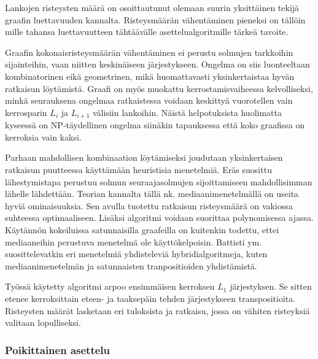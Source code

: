 \documentclass[finnish,12pt]{article}
\begin{document}

Lankojen risteysten määrä on osoittautunut olemaan suurin yksittäinen tekijä graafin luettavuuden kannalta. \cite{RefWorks:47}
Risteysmäärän vähentäminen pieneksi on tällöin mille tahansa luettavuutteen tähtäävälle asettelualgoritmille tärkeä tavoite.

Graafin kokonaisristeysmäärän vähentäminen ei perustu solmujen tarkkoihin sijainteihin, vaan niitten keskinäiseen järjestykseen.
Ongelma on siis luonteeltaan kombinatorinen eikä geometrinen, mikä huomattavasti yksinkertaistaa hyvän ratkaisun löytämistä.
Graafi on myös muokattu kerrostamisvaiheessa kelvolliseksi, minkä seurauksena ongelmaa ratkaistessa voidaan keskittyä vuorotellen vain kerrosparin $L_i$ ja $L_{i+1}$ välisiin lankoihin.
Näistä helpotuksista huolimatta kyseessä on NP-täydellinen ongelma siinäkin tapauksessa että koko graafissa on kerroksia vain kaksi. \cite{RefWorks:40}

Parhaan mahdollisen kombinaation löytämiseksi joudutaan yksinkertaisen ratkaisun puutteessa käyttämään heuristisia menetelmiä.
Eräs suosittu lähestymistapa perustuu solmun seuraajasolmujen sijoittamiseen mahdollisimman lähelle lähdettään.
Teorian kannalta tällä nk. mediaanimenetelmällä on useita hyviä ominaisuuksia.
Sen avulla tuotettu ratkaisun risteysmäärä on vakiossa suhteessa optimaaliseen.
Lisäksi algoritmi voidaan suorittaa polynomisessa ajassa.
Käytännön kokeiluissa satunnaisilla graafeilla on kuitenkin todettu, ettei mediaaneihin perustuva menetelmä ole käyttökelpoisin. \cite{RefWorks:52}
Battisti ym. suosittelevatkin eri menetelmiä yhdisteleviä hybridialgoritmeja, kuten mediaanimenetelmän ja satunnaisten tranpositioiden yhdistämistä\cite{RefWorks:39}.

Työssä käytetty algoritmi arpoo ensimmäisen kerroksen $L_1$ järjestyksen.
Se sitten etenee kerroksittain eteen- ja taaksepäin tehden järjestykseen transpositioita.
Risteysten määrät lasketaan eri tuloksista ja ratkaisu, jossa on vähiten risteyksiä valitaan lopulliseksi.


		\subsubsection{Poikittainen asettelu}
\end{document}
